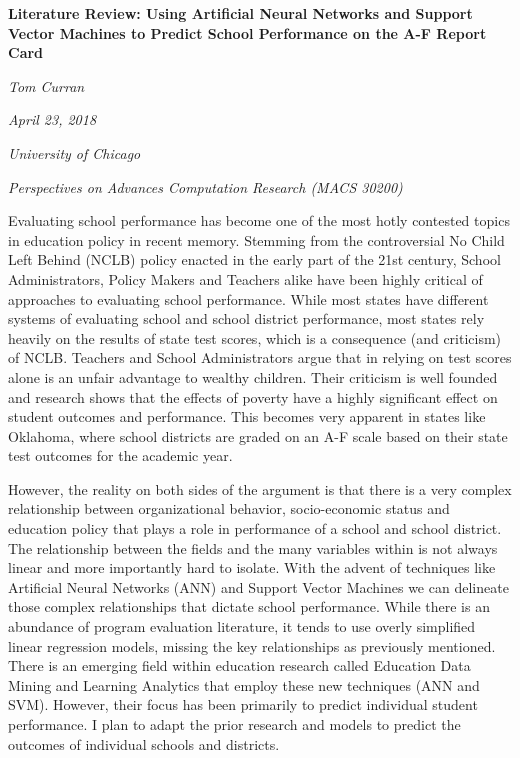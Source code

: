 \documentclass[12pt,a4paper]{article}
\begin{document}
\begin{titlepage}
	\begin{center}
		\Large\textbf{Literature Review: Using Artificial Neural Networks and Support Vector Machines to Predict School Performance on the A-F Report Card}\linebreak
		
		\large\textit{Tom Curran}
		
		\large\textit{April 23, 2018}
		
		\large\textit{University of Chicago}
		
		\large\textit{Perspectives on Advances Computation Research (MACS 30200)}
		
	\end{center}
\end{titlepage}
\doublespacing

		Evaluating school performance has become one of the most hotly contested topics in education policy in recent memory. Stemming from the controversial No Child Left Behind (NCLB) policy enacted in the early part of the 21st century, School Administrators, Policy Makers and Teachers alike have been highly critical of approaches to evaluating school performance. While most states have different systems of evaluating school and school district performance, most states rely heavily on the results of state test scores, which is a consequence (and criticism) of NCLB. Teachers and School Administrators argue that in relying on test scores alone is an unfair advantage to wealthy children. Their criticism is well founded and research shows that the effects of poverty have a highly significant effect on student outcomes and performance. This becomes very apparent in states like Oklahoma, where school districts are graded on an A-F scale based on their state test outcomes for the academic year. 

However, the reality on both sides of the argument is that there is a very complex relationship between organizational behavior, socio-economic status and education policy that plays a role in performance of a school and school district. The relationship between the fields and the many variables within is not always linear and more importantly hard to isolate. With the advent of techniques like Artificial Neural Networks (ANN) and Support Vector Machines we can delineate those complex relationships that dictate school performance. While there is an abundance of program evaluation literature, it tends to use overly simplified linear regression models, missing the key relationships as previously mentioned. There is an emerging field within education research called Education Data Mining and Learning Analytics that employ these new techniques (ANN and SVM). However, their focus has been primarily to predict individual student performance. I plan to adapt the prior research and models to predict the outcomes of individual schools and districts.
\end{document}
